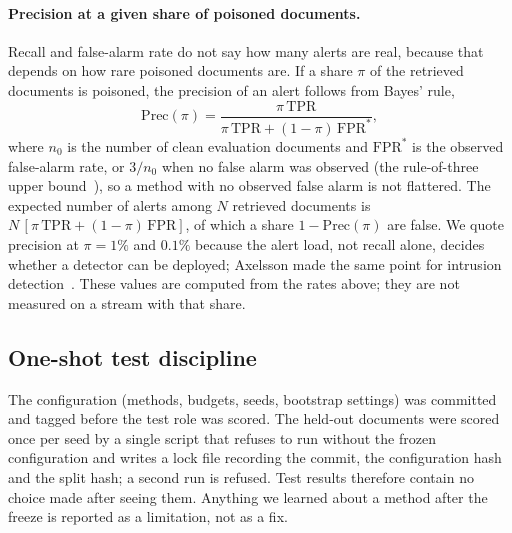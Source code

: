 \paragraph{Precision at a given share of poisoned documents.}
Recall and false-alarm rate do not say how many alerts are real, because that
depends on how rare poisoned documents are. If a share $\pi$ of the retrieved
documents is poisoned, the precision of an alert follows from Bayes' rule,
\begin{equation}
    \mathrm{Prec}(\pi)=\frac{\pi\,\mathrm{TPR}}{\pi\,\mathrm{TPR}+(1-\pi)\,\mathrm{FPR}^{*}},
    \label{eq:precision}
\end{equation}
where $n_0$ is the number of clean evaluation documents and $\mathrm{FPR}^{*}$ is
the observed false-alarm rate, or $3/n_0$ when no false alarm was observed
(the rule-of-three upper bound~\cite{hanley1983zero}), so a method with no observed false alarm is
not flattered. The expected number of
alerts among $N$ retrieved documents is $N\,[\pi\,\mathrm{TPR}+(1-\pi)\,\mathrm{FPR}]$,
of which a share $1-\mathrm{Prec}(\pi)$ are false. We quote precision at
$\pi=1\%$ and $0.1\%$ because the alert load, not recall alone, decides whether
a detector can be deployed; Axelsson made the same point for intrusion
detection~\cite{axelsson2000base}. These values are computed from the rates above; they
are not measured on a stream with that share.

\subsection{One-shot test discipline}
The configuration (methods, budgets, seeds, bootstrap settings) was committed
and tagged before the test role was scored. The held-out documents were scored
once per seed by a single script that refuses to run without the frozen
configuration and writes a lock file recording the commit, the configuration
hash and the split hash; a second run is refused. Test results therefore
contain no choice made after seeing them. Anything we learned about a method
after the freeze is reported as a limitation, not as a fix.